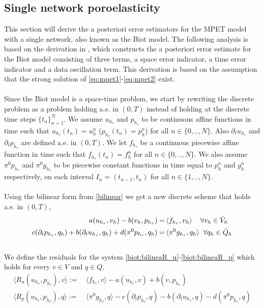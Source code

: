 \subsection{Single network poroelasticity} \label{section:error_biot}
This section will derive the a posteriori error estimators for the MPET model with a single network, also known as the Biot model. The following analysis is based on the derivation in \cite{meunier}, which constructs the a posteriori error estimate for the Biot model consisting of three terms, a space error indicator, a time error indicator and a data oscillation term. This derivation is based on the assumption that the strong solution of \eqref{eq:mpet1}-\eqref{eq:mpet2} exist. %
\\
\\ 
Since the Biot model is a space-time problem, we start by rewriting the discrete problem as a problem holding a.e. in $(0,T)$ instead of holding at the discrete time steps $\{t_n\}_{n=1}^N$. We assume $u_{h_\tau}$ and $p_{h_\tau}$ to be continuous affine functions in time such that $u_{h_\tau}(t_n) = u_h^n$ ($p_{h_\tau}(t_n) = p_h^n$) for all $n \in \{0,..,N\}$. Also $\partial_t u_{h_\tau}$ and $\partial_t p_{h_\tau}$ are defined a.e. in $(0,T)$. We let $f_{h_\tau}$ be a continuous piecewise affine function in time such that $f_{h_\tau}(t_n) = f_h^n$ for all $n \in \{0,..,N\}$. We also assume $\pi^0p_{h_\tau}$ and $\pi^0g_{h_\tau}$ to be piecewise constant functions in time equal to $p_h^n$ and $g_h^n$ respectively, on each interval $I_n = (t_{n-1}, t_n)$ for all $n \in \{1,..,N\}$. 
\\ \\
Using the bilinear form from \eqref{bilinear} we get a new discrete scheme that holds a.e. in $(0,T)$, 
\begin{align}
a(u_{h_\tau}, v_h) - b(v_h, p_{h_\tau}) = & \, \langle f_{h_\tau}, v_h \rangle \hspace{0.4cm} \forall v_h \in \hat{V}_h \label{biot:bilineaR_u} \\
c(\partial_t p_{h_\tau}, q_h) + b(\partial_t u_{h_\tau}, q_h) + d(\pi^0p_{h_\tau}, q_h) = & \, \langle \pi^0g_{h_\tau}, q_h \rangle \hspace{0.2cm} \forall q_h \in \hat{Q}_h \label{biot:bilineaR_p}
\end{align}
\\
We define the residuals for the system \eqref{biot:bilineaR_u}-\eqref{biot:bilineaR_p} which holds for every $v \in V$ and $q \in Q$,
\begin{align}
\langle R_u(u_{h_\tau}, p_{h_\tau}), v\rangle := & \, \langle f_{h_\tau}, v\rangle - a(u_{h_\tau}, v) + b(v, p_{h_\tau}) \\
\langle R_p(u_{h_\tau}, p_{h_\tau}), q\rangle := & \, \langle \pi^0g_{h_\tau}, q \rangle - c(\partial_t p_{h_\tau}, q) - b(\partial_t u_{h_\tau}, q) - d(\pi^0p_{h_\tau}, q)
\end{align}
